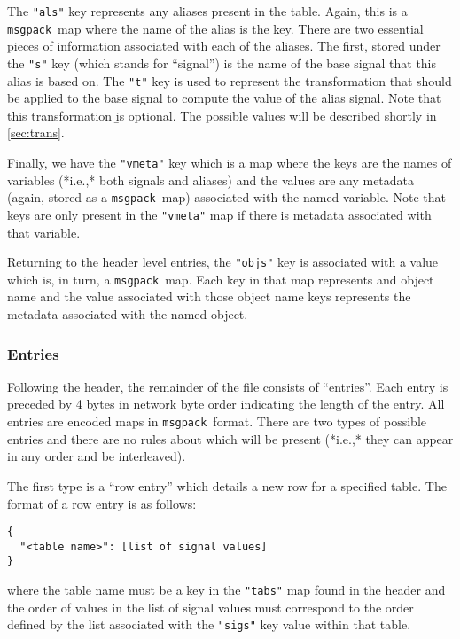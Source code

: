 \documentclass[11pt,a4paper,onecolumn]{article}
\newcommand{\msgpack}{\texttt{msgpack}}
\newcommand{\code}[1]{\texttt{#1}} %
\begin{document}
The \code{"als"} key represents any aliases present in the table.
Again, this is a \msgpack\ map where the name of the alias is the key.
There are two essential pieces of information associated with each of
the aliases.  The first, stored under the \code{"s"} key (which stands
for ``signal'') is the name of the base signal that this alias is
based on.  The \code{"t"} key is used to represent the transformation
that should be applied to the base signal to compute the value of the
alias signal.  Note that this transformation {\b is optional}.  The
possible values will be described shortly in \ref{sec:trans}.

Finally, we have the \code{"vmeta"} key which is a map where the keys
are the names of variables (*i.e.,* both signals and aliases) and the
values are any metadata (again, stored as a \msgpack\ map) associated
with the named variable.  Note that keys are only present in the
\code{"vmeta"} map if there is metadata associated with that variable.

Returning to the header level entries, the \code{"objs"} key is
associated with a value which is, in turn, a \msgpack\ map.  Each key
in that map represents and object name and the value associated with
those object name keys represents the metadata associated with the
named object.

\subsubsection{Entries}

Following the header, the remainder of the file consists of
``entries''.  Each entry is preceded by 4 bytes in network byte order
indicating the length of the entry.  All entries are encoded maps in
\msgpack\ format.  There are two types of possible entries and there
are no rules about which will be present (*i.e.,* they can appear in
any order and be interleaved).

The first type is a ``row entry'' which details a new row for a
specified table.  The format of a row entry is as follows:

\begin{verbatim}
{
  "<table name>": [list of signal values]
}
\end{verbatim}

where the table name must be a key in the \code{"tabs"} map found in
the header and the order of values in the list of signal values must
correspond to the order defined by the list associated with the
\code{"sigs"} key value within that table.
\end{document}
